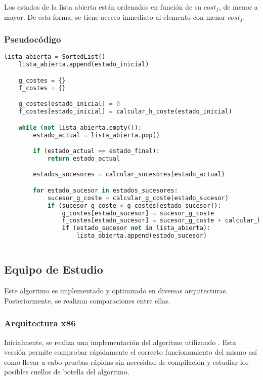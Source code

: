 Los estados de la lista abierta están ordenados en función de su $cost_f$,
de menor a mayor.
De esta forma, se tiene acceso inmediato al elemento con menor $cost_f$.

\pagebreak

\subsubsection{Pseudocódigo}

\begin{lstlisting}[language=Python]
    lista_abierta = SortedList()
    lista_abierta.append(estado_inicial)

    g_costes = {}
    f_costes = {}

    g_costes[estado_inicial] = 0
    f_costes[estado_inicial] = calcular_h_coste(estado_inicial)

    while (not lista_abierta.empty()):
        estado_actual = lista_abierta.pop()

        if (estado_actual == estado_final):
            return estado_actual

        estados_sucesores = calcular_sucesores(estado_actual)

        for estado_sucesor in estados_sucesores:
            sucesor_g_coste = calcular_g_coste(estado_sucesor)
            if (sucesor_g_coste < g_costes[estado_sucesor]):
                g_costes[estado_sucesor] = sucesor_g_coste
                f_costes[estado_sucesor] = sucesor_g_coste + calcular_h_coste(estado_sucesor)
                if (estado_sucesor not in lista_abierta):
                    lista_abierta.append(estado_sucesor)
            
\end{lstlisting}

\subsection{Equipo de Estudio}

Este algoritmo es implementado y optimizado en diversas arquitecturas.
Posteriormente, se realizan comparaciones entre ellas.

\subsubsection{Arquitectura x86}

Inicialmente, se realiza una implementación del algoritmo utilizando \Python.
Esta versión permite comprobar rápidamente el correcto funcionamiento del mismo
así como llevar a cabo pruebas rápidas sin necesidad de compilación y
estudiar los posibles cuellos de botella del algoritmo.

